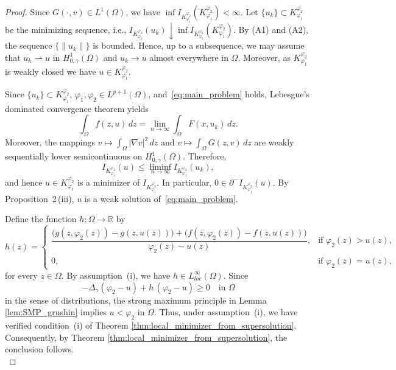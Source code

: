 \documentclass[11pt]{article}
\newcommand{\om} {\Omega}
\newcommand{\Gr}{\Delta_{\gamma}}
\newcommand{\spacegr}{H^{1}_{0,\gamma}(\Omega)}
\begin{document}
\begin{proof}
Since $G(\cdot, v) \in L^1(\om)$, we have $\inf I_{K_{\varphi_1}^{\varphi_2}}\!\left( K_{\varphi_1}^{\varphi_2} \right) < \infty.$
Let $\{u_k\} \subset K_{\varphi_1}^{\varphi_2}$ be the minimizing sequence, i.e., $I_{K_{\varphi_1}^{\varphi_2}}(u_k) \downarrow \inf I_{K_{\varphi_1}^{\varphi_2}}\!\left( K_{\varphi_1}^{\varphi_2} \right)$.
By \textnormal{(A1)} and \textnormal{(A2)}, the sequence $\{ \|u_k\| \}$ is bounded. Hence, up to a subsequence, we may assume that $u_k \rightharpoonup u$ in $\spacegr$ and $u_k \to u$ almost everywhere in $\Omega$. Moreover, as $K_{\varphi_1}^{\varphi_2}$ is weakly closed we have $u \in K_{\varphi_1}^{\varphi_2}$.

Since $\{u_k\} \subset K_{\varphi_1}^{\varphi_2}$, $\varphi_1, \varphi_2 \in L^{p+1}(\Omega)$, and~\eqref{eq:main_problem} holds, Lebesgue's dominated convergence theorem yields
\begin{equation*}
\int_{\Omega} f(z,u)\, dz = \lim_{n \to \infty} \int_{\Omega} F(x,u_k)\, dz .
\end{equation*}
Moreover, the mappings $v \mapsto \int_{\Omega} |\nabla v|^{2} \, dz$ and $v \mapsto \int_{\Omega} G(z,v)\, dz$ are weakly sequentially lower semicontinuous on $\spacegr$. Therefore,
\begin{equation*}
I_{K_{\varphi_1}^{\varphi_2}}(u) \le \liminf_{n \to \infty} I_{K_{\varphi_1}^{\varphi_2}}(u_k),
\end{equation*}
and hence $u \in K_{\varphi_1}^{\varphi_2}$ is a minimizer of $I_{K_{\varphi_1}^{\varphi_2}}$. In particular, $0 \in \partial^{-} I_{K_{\varphi_1}^{\varphi_2}}(u)$. By Proposition~2\,(iii), $u$ is a weak solution of~\eqref{eq:main_problem}.

Define the function $h : \Omega \to \mathbb{R}$ by
\begin{equation*}
h(z) =
\begin{cases}
\dfrac{\bigl( g(z,\varphi_2(z)) - g(z,u(z)) \bigr)
      + \bigl( f(z,\varphi_2(z)) - f(z,u(z)) \bigr)}
      {\varphi_2(z) - u(z)},
& \text{if } \varphi_2(z) > u(z), \\[1.2ex]
0, & \text{if } \varphi_2(z) = u(z),
\end{cases}
\end{equation*}
for every $z \in \Omega$. By assumption~\textnormal{(i)}, we have $h \in L_{loc}^{\infty}(\Omega)$. Since
\begin{equation*}
- \Gr(\varphi_2 - u) + h\,(\varphi_2 - u) \ge 0
\quad \text{in } \Omega
\end{equation*}
in the sense of distributions, the strong maximum principle in Lemma \ref{lem:SMP_grushin} implies $u < \varphi_2$ in $\om$.  Thus, under assumption~\textnormal{(i)}, we have verified condition~\textnormal{(i)} of Theorem \ref{thm:local_minimizer_from_supersolution}. Consequently, by Theorem \ref{thm:local_minimizer_from_supersolution}, the conclusion follows. \\
\end{proof}
\medskip
\end{document}
